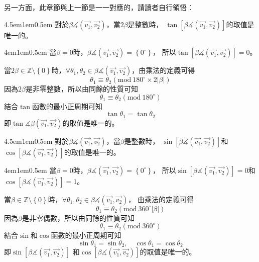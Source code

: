 \documentclass[12pt]{article}
\begin{document}
另一方面，此章節與上一節是一一對應的，請讀者自行領悟：
\begin{mybox}[允許1]{4.5em}{1em}{0.5em}
    對於$\beta\measuredangle{\left(\overrightarrow{v_1},\overrightarrow{v_2}\right)}$，當$2\beta$是整數時，
    $\tan{\left[\beta\measuredangle{\left(\overrightarrow{v_1},\overrightarrow{v_2}\right)}\right]}$的取值是唯一的。
\end{mybox}
\begin{mybox}[證明]{4em}{1em}{0.5em}
    當$\beta=0$時，$\beta\measuredangle{\left(\overrightarrow{v_1},\overrightarrow{v_2}\right)}=\left\{0^{\circ}\right\}$，
    所以$\tan{\left[\beta\measuredangle{\left(\overrightarrow{v_1},\overrightarrow{v_2}\right)}\right]}=0$。

    當$2\beta\in\mathbb{Z}\setminus\left\{0\right\}$時，$\forall \theta_1,\theta_2\in\beta\measuredangle{\left(\overrightarrow{v_1},\overrightarrow{v_2}\right)}$，由乘法的定義可得
    $$
        \theta_1\equiv\theta_2\left(\text{mod}\ {180^{\circ}\times 2|\beta|}\right)
    $$
    因為$2\beta$是非零整數，所以由同餘的性質可知
    $$
        \theta_1\equiv\theta_2\left(\text{mod}\ {180^{\circ}}\right)
    $$
    結合$\tan$函數的最小正周期可知
    $$
        \tan{\theta_1}=\tan{\theta_2}
    $$
    即$\tan{\measuredangle{\beta\left(\overrightarrow{v_1},\overrightarrow{v_2}\right)}}$的取值是唯一的。
\end{mybox}
\begin{mybox}[允許2]{4.5em}{1em}{0.5em}
    對於$\beta\measuredangle{\left(\overrightarrow{v_1},\overrightarrow{v_2}\right)}$，當$\beta$是整數時，
    $\sin{\left[\beta\measuredangle{\left(\overrightarrow{v_1},\overrightarrow{v_2}\right)}\right]}$和
    $\cos{\left[\beta\measuredangle{\left(\overrightarrow{v_1},\overrightarrow{v_2}\right)}\right]}$的取值是唯一的。
\end{mybox}
\begin{mybox}[證明]{4em}{1em}{0.5em}
    當$\beta=0$時，$\beta\measuredangle{\left(\overrightarrow{v_1},\overrightarrow{v_2}\right)}=\left\{0^{\circ}\right\}$，
    所以$\sin{\left[\beta\measuredangle{\left(\overrightarrow{v_1},\overrightarrow{v_2}\right)}\right]}=0$和
    $\cos{\left[\beta\measuredangle{\left(\overrightarrow{v_1},\overrightarrow{v_2}\right)}\right]}=1$。

    當$\beta\in\mathbb{Z}\setminus\left\{0\right\}$時，$\forall \theta_1,\theta_2\in\beta\measuredangle{\left(\overrightarrow{v_1},\overrightarrow{v_2}\right)}$，
    由乘法的定義可得
    $$
        \theta_1\equiv\theta_2\left(\text{mod}\ {360^{\circ}|\beta|}\right)
    $$
    因為$\beta$是非零偶數，所以由同餘的性質可知
    $$
        \theta_1\equiv\theta_2\left(\text{mod}\ {360^{\circ}}\right)
    $$
    結合$\sin{}$和$\cos{}$函數的最小正周期可知
    $$
        \sin{\theta_1}=\sin{\theta_2},\quad \cos{\theta_1}=\cos{\theta_2}
    $$
    即$\sin{\left[\beta\measuredangle{\left(\overrightarrow{v_1},\overrightarrow{v_2}\right)}\right]}$
    和$\cos{\left[\beta\measuredangle{\left(\overrightarrow{v_1},\overrightarrow{v_2}\right)}\right]}$的取值是唯一的。
\end{mybox}
\end{document}
